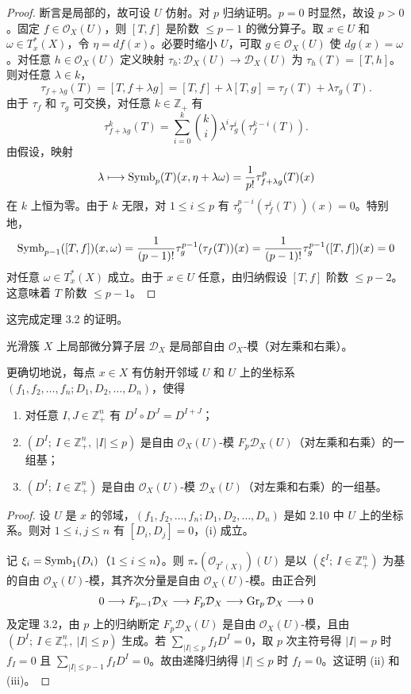 \begin{proof}
断言是局部的，故可设 $U$ 仿射。对 $p$ 归纳证明。$p=0$ 时显然，故设 $p>0$。固定 $f\in\mathcal{O}_X(U)$，则 $[T,f]$ 是阶数 $\le p-1$ 的微分算子。取 $x\in U$ 和 $\omega\in T^*_x(X)$，令 $\eta=df(x)$。必要时缩小 $U$，可取 $g\in\mathcal{O}_X(U)$ 使 $dg(x)=\omega$。对任意 $h\in\mathcal{O}_X(U)$ 定义映射 $\tau_h:\mathcal{D}_X(U)\to\mathcal{D}_X(U)$ 为 $\tau_h(T)=[T,h]$。则对任意 $\lambda\in k$，
$$\tau_{f+\lambda g}(T)=[T,f+\lambda g]=[T,f]+\lambda[T,g]=\tau_f(T)+\lambda\tau_g(T).$$
由于 $\tau_f$ 和 $\tau_g$ 可交换，对任意 $k\in\mathbb{Z}_+$ 有
$$\tau_{f+\lambda g}^k(T)=\sum_{i=0}^k\binom{k}{i}\lambda^i\tau_g^i(\tau_f^{k-i}(T)).$$
由假设，映射
$$\lambda\longmapsto\operatorname{Symb}_p(T)(x,\eta+\lambda\omega)=\frac{1}{p!}\tau_{f+\lambda g}^p(T)(x)$$
在 $k$ 上恒为零。由于 $k$ 无限，对 $1\le i\le p$ 有 $\tau_g^{p-i}(\tau_f^i(T))(x)=0$。特别地，
$$\operatorname{Symb}_{p-1}([T,f])(x,\omega)=\frac{1}{(p-1)!}\tau_g^{p-1}(\tau_f(T))(x)=\frac{1}{(p-1)!}\tau_g^{p-1}([T,f])(x)=0$$
对任意 $\omega\in T^*_x(X)$ 成立。由于 $x\in U$ 任意，由归纳假设 $[T,f]$ 阶数 $\le p-2$。这意味着 $T$ 阶数 $\le p-1$。
\end{proof}

这完成定理 3.2 的证明。

\begin{proposition}
光滑簇 $X$ 上局部微分算子层 $\mathcal{D}_X$ 是局部自由 $\mathcal{O}_X$-模（对左乘和右乘）。

更确切地说，每点 $x\in X$ 有仿射开邻域 $U$ 和 $U$ 上的坐标系 $(f_1,f_2,\dots,f_n;D_1,D_2,\dots,D_n)$，使得
\begin{enumerate}[label=(\roman*)]
  \item 对任意 $I,J\in\mathbb{Z}_+^n$ 有 $D^I\circ D^J=D^{I+J}$；
  \item $(D^I;\ I\in\mathbb{Z}_+^n,\ |I|\le p)$ 是自由 $\mathcal{O}_X(U)$-模 $F_p\mathcal{D}_X(U)$（对左乘和右乘）的一组基；
  \item $(D^I;\ I\in\mathbb{Z}_+^n)$ 是自由 $\mathcal{O}_X(U)$-模 $\mathcal{D}_X(U)$（对左乘和右乘）的一组基。
\end{enumerate}
\end{proposition}

\begin{proof}
设 $U$ 是 $x$ 的邻域，$(f_1,f_2,\dots,f_n;D_1,D_2,\dots,D_n)$ 是如 2.10 中 $U$ 上的坐标系。则对 $1\le i,j\le n$ 有 $[D_i,D_j]=0$，(i) 成立。

记 $\xi_i=\operatorname{Symb}_1(D_i)$（$1\le i\le n$）。则 $\pi_*(\mathcal{O}_{T^*(X)})(U)$ 是以 $(\xi^I;\ I\in\mathbb{Z}_+^n)$ 为基的自由 $\mathcal{O}_X(U)$-模，其齐次分量是自由 $\mathcal{O}_X(U)$-模。由正合列
$$0\longrightarrow F_{p-1}\mathcal{D}_X\longrightarrow F_p\mathcal{D}_X\longrightarrow\operatorname{Gr}_p\mathcal{D}_X\longrightarrow 0$$
及定理 3.2，由 $p$ 上的归纳断定 $F_p\mathcal{D}_X(U)$ 是自由 $\mathcal{O}_X(U)$-模，且由 $(D^I;\ I\in\mathbb{Z}_+^n,\ |I|\le p)$ 生成。若 $\sum_{|I|\le p}f_ID^I=0$，取 $p$ 次主符号得 $|I|=p$ 时 $f_I=0$ 且 $\sum_{|I|\le p-1}f_ID^I=0$。故由递降归纳得 $|I|\le p$ 时 $f_I=0$。这证明 (ii) 和 (iii)。
\end{proof}

